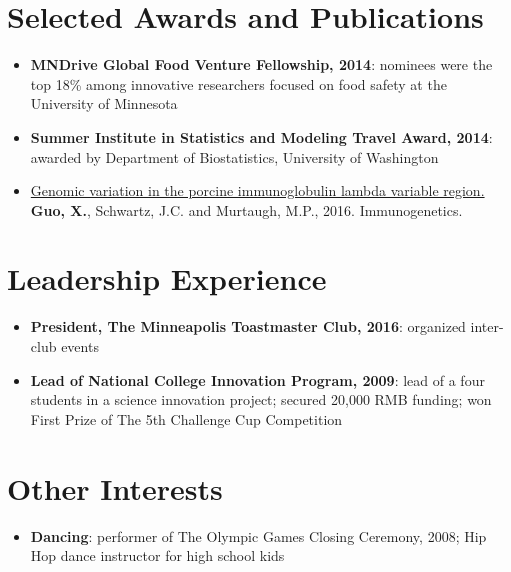 \documentclass[letterpaper,11pt]{article}
\newcommand{\resumeItem}[2]{
  \item\small{
    \textbf{#1}{: #2 \vspace{-2pt}}
  }
}
\newcommand{\resumeSubItem}[2]{\resumeItem{#1}{#2}\vspace{-4pt}}
\newcommand{\resumeSubHeadingListStart}{\begin{itemize}[leftmargin=*]}
\newcommand{\resumeSubHeadingListEnd}{\end{itemize}}
\begin{document}
  
\section{Selected Awards and Publications}
  \resumeSubHeadingListStart
	  \resumeSubItem{MNDrive Global Food Venture Fellowship, 2014}{nominees were the top 18\%  among innovative researchers focused on food safety at the University of Minnesota}
	\resumeSubItem{Summer Institute in Statistics and Modeling Travel Award, 2014}{awarded by Department of Biostatistics, University of Washington}
  	\item{\href{http://link.springer.com/article/10.1007/s00251-016-0899-9}
    {Genomic variation in the porcine immunoglobulin lambda variable region. }}{\textbf{Guo, X.}, Schwartz, J.C. and Murtaugh, M.P., 2016. Immunogenetics.}
    	\resumeSubHeadingListEnd

\section{Leadership Experience}
\resumeSubHeadingListStart
	\resumeSubItem{President, The Minneapolis Toastmaster Club, 2016}{organized inter-club events}
	\resumeSubItem{Lead of National College Innovation Program, 2009}{lead of a four students in a science innovation project; secured 20,000 RMB funding; won First Prize of The 5th Challenge Cup Competition}
\resumeSubHeadingListEnd
%


\section{Other Interests}
 \resumeSubHeadingListStart
 \resumeSubItem{Dancing}{performer of The Olympic Games Closing Ceremony, 2008; Hip Hop dance instructor for high school kids}
\resumeSubHeadingListEnd
\end{document}
